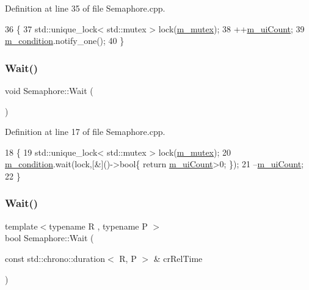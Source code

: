 Definition at line 35 of file Semaphore.\+cpp.


\begin{DoxyCode}
36 \{
37       std::unique\_lock< std::mutex > lock(\hyperlink{classSemaphore_a6490f302f311da3ce373a81672673296}{m\_mutex});
38       ++\hyperlink{classSemaphore_a1456f105008b0c309f41211afbdd5fee}{m\_uiCount};
39       \hyperlink{classSemaphore_a2b04d3a53f1fc1a13d7ed5d19d9e2be9}{m\_condition}.notify\_one();
40 \}
\end{DoxyCode}
\mbox{\label{classSemaphore_a72aabebf026e3a8b1f3e4d0fa8ee1eda}} 
\subsubsection{\texorpdfstring{Wait()}{Wait()}\hspace{0.1cm}{\footnotesize\ttfamily [1/2]}}
{\footnotesize\ttfamily void Semaphore\+::\+Wait (\begin{DoxyParamCaption}{ }\end{DoxyParamCaption})}



Definition at line 17 of file Semaphore.\+cpp.


\begin{DoxyCode}
18 \{
19       std::unique\_lock< std::mutex > lock(\hyperlink{classSemaphore_a6490f302f311da3ce373a81672673296}{m\_mutex});
20       \hyperlink{classSemaphore_a2b04d3a53f1fc1a13d7ed5d19d9e2be9}{m\_condition}.wait(lock,[&]()->\textcolor{keywordtype}{bool}\{ \textcolor{keywordflow}{return} \hyperlink{classSemaphore_a1456f105008b0c309f41211afbdd5fee}{m\_uiCount}>0; \});
21       --\hyperlink{classSemaphore_a1456f105008b0c309f41211afbdd5fee}{m\_uiCount};
22 \}
\end{DoxyCode}
\mbox{\label{classSemaphore_a7f700173ae86ae623684109066e07656}} 
\subsubsection{\texorpdfstring{Wait()}{Wait()}\hspace{0.1cm}{\footnotesize\ttfamily [2/2]}}
{\footnotesize\ttfamily template$<$typename R , typename P $>$ \\
bool Semaphore\+::\+Wait (\begin{DoxyParamCaption}\item[{const std\+::chrono\+::duration$<$ R, P $>$ \&}]{cr\+Rel\+Time }\end{DoxyParamCaption})}



